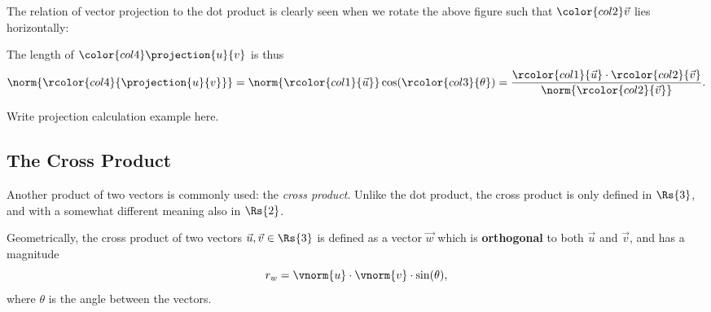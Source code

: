 The relation of vector projection to the dot product is clearly seen when we rotate the above figure such that $\color{col2}\vec{v}$ lies horizontally:
\begin{figure}[H]
  \centering
\end{figure}

The length of $\color{col4}\projection{u}{v}$ is thus
\begin{equation*}
  \norm{\rcolor{col4}{\projection{u}{v}}} = \norm{\rcolor{col1}{\vec{u}}} \cos(\rcolor{col3}{\theta}) = \frac{\rcolor{col1}{\vec{u}}\cdot\rcolor{col2}{\vec{v}}}{\norm{\rcolor{col2}{\vec{v}}}}.
\end{equation*}

\begin{example}
  Write projection calculation example here.
\end{example}

\subsection{The Cross Product}
Another product of two vectors is commonly used: the \emph{cross product}. Unlike the dot product, the cross product is only defined in $\Rs{3}$, and with a somewhat different meaning also in $\Rs{2}$.

Geometrically, the cross product of two vectors $\vec{u}, \vec{v} \in \Rs{3}$ is defined as a vector $\vec{w}$ which is \textbf{orthogonal} to both $\vec{u}$ and $\vec{v}$, and has a magnitude
\begin{equation*}
  r_{w} = \vnorm{u}\cdot\vnorm{v}\cdot\sin(\theta),
\end{equation*}
where $\theta$ is the angle between the vectors.

